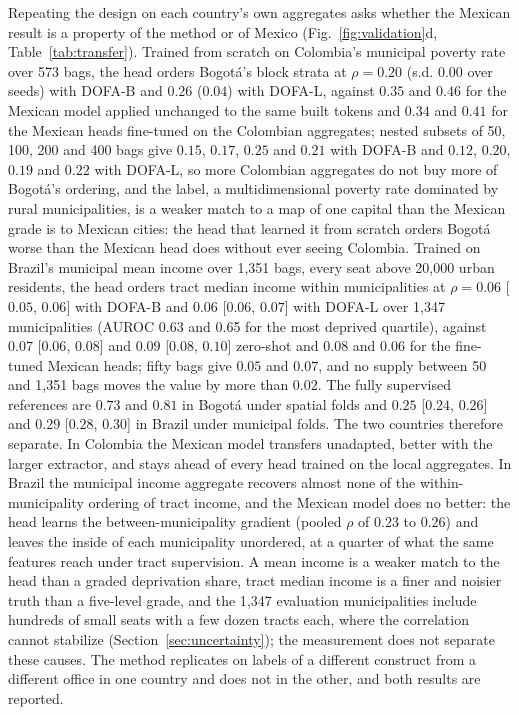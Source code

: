 \documentclass[11pt]{article}
\begin{document}
Repeating the design on each country's own aggregates asks whether the Mexican result is
a property of the method or of Mexico (Fig.~\ref{fig:validation}d,
Table~\ref{tab:transfer}). Trained from scratch on Colombia's municipal poverty rate over
573 bags, the head orders Bogot\'a's block strata at $\rho = 0.20$ (s.d. $0.00$ over
seeds) with DOFA-B and $0.26$ ($0.04$) with DOFA-L, against $0.35$ and $0.46$ for the
Mexican model applied unchanged to the same built tokens and $0.34$ and $0.41$ for the
Mexican heads fine-tuned on the Colombian aggregates; nested subsets of 50, 100, 200 and
400 bags give $0.15$, $0.17$, $0.25$ and $0.21$ with DOFA-B and $0.12$, $0.20$, $0.19$
and $0.22$ with DOFA-L, so more Colombian aggregates do not buy more of Bogot\'a's
ordering, and the label, a multidimensional poverty rate dominated by rural
municipalities, is a weaker match to a map of one capital than the Mexican grade is to
Mexican cities: the head that learned it from scratch orders Bogot\'a worse than the
Mexican head does without ever seeing Colombia. Trained on Brazil's municipal mean
income over 1{,}351 bags, every seat above 20{,}000 urban residents, the head orders
tract median income within municipalities at $\rho = 0.06$ [$0.05$, $0.06$] with DOFA-B
and $0.06$ [$0.06$, $0.07$] with DOFA-L over 1{,}347 municipalities (AUROC 0.63 and 0.65
for the most deprived quartile), against $0.07$ [$0.06$, $0.08$] and $0.09$ [$0.08$,
$0.10$] zero-shot and $0.08$ and $0.06$ for the fine-tuned Mexican heads; fifty bags
give $0.05$ and $0.07$, and no supply between 50 and 1{,}351 bags moves the value by
more than $0.02$. The fully supervised references are $0.73$ and $0.81$ in Bogot\'a
under spatial folds and $0.25$ [$0.24$, $0.26$] and $0.29$ [$0.28$, $0.30$] in Brazil
under municipal folds. The two countries therefore separate. In Colombia the Mexican
model transfers unadapted, better with the larger extractor, and stays ahead of every
head trained on the local aggregates. In Brazil the municipal income aggregate recovers
almost none of the within-municipality ordering of tract income, and the Mexican model
does no better: the head learns the between-municipality gradient (pooled $\rho$ of
$0.23$ to $0.26$) and leaves the inside of each municipality unordered, at a quarter of
what the same features reach under tract supervision. A mean income is a weaker match
to the head than a graded deprivation share, tract median income is a finer and noisier
truth than a five-level grade, and the 1{,}347 evaluation municipalities include
hundreds of small seats with a few dozen tracts each, where the correlation cannot
stabilize (Section~\ref{sec:uncertainty}); the measurement does not separate these
causes. The method replicates on labels of a different construct from a different
office in one country and does not in the other, and both results are reported.
\end{document}
